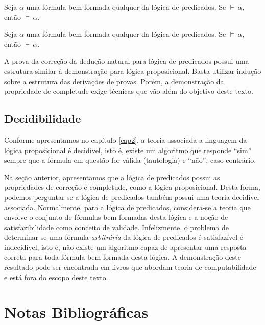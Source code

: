 \begin{Theorem}
Seja $\alpha$ uma fórmula bem formada qualquer da lógica
de predicados. Se $\vdash\,\alpha$, então $\models\,\alpha$.
\end{Theorem}

\begin{Theorem}
Seja $\alpha$ uma fórmula bem formada qualquer da lógica
de predicados. Se $\models\,\alpha$, então $\vdash\,\alpha$.
\end{Theorem}

A prova da correção da dedução natural para lógica de predicados
possui uma estrutura similar à demonstração para lógica
proposicional. Basta utilizar indução sobre a estrutura das derivações
de provas. Porém, a demonstração da propriedade de completude exige
técnicas que vão além do objetivo deste texto.

\subsection{Decidibilidade}

Conforme apresentamos no capítulo \ref{cap2}, a teoria associada a
linguagem da lógica proposicional é decidível, isto é, existe um
algoritmo que responde ``sim'' sempre que a fórmula em questão for
válida (tautologia) e ``não'', caso contrário.

Na seção anterior, apresentamos que a lógica de predicados possui as
propriedades de correção e completude, como a lógica
proposicional. Desta forma, podemos perguntar se a lógica de predicados  também
possui uma teoria decidível associada. Normalmente, para a lógica de
predicados, considera-se a teoria que envolve o conjunto de fórmulas
bem formadas desta lógica e a noção de satisfazibilidade como conceito
de validade. Infelizmente, o problema de determinar se uma fórmula
\emph{arbitrária} da lógica de predicados é satisfazível é
indecidível, isto é, não existe um algoritmo capaz de apresentar uma
resposta correta para toda fórmula bem formada desta lógica. A
demonstração deste resultado pode ser encontrada em livros que abordam
teoria de computabilidade e está fora do escopo deste texto.

\section{Notas Bibliográficas}